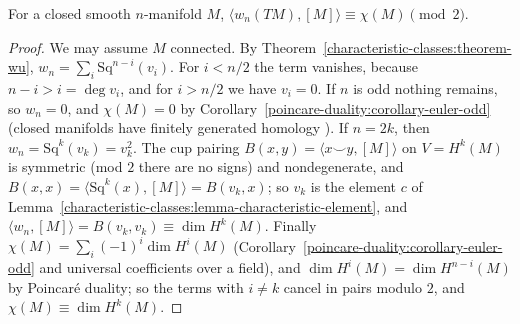 \begin{corollary}\label{characteristic-classes:corollary-top-stiefel-whitney}
For a closed smooth $n$-manifold $M$, $\langle w_n(TM), [M]\rangle \equiv \chi(M) \pmod 2$.
\end{corollary}

\begin{proof}
We may assume $M$ connected. By Theorem~\ref{characteristic-classes:theorem-wu}, $w_n = \sum_i\mathrm{Sq}^{n-i}(v_i)$. For $i < n/2$ the term vanishes,
because $n - i > i = \deg v_i$, and for $i > n/2$ we have $v_i = 0$. If $n$ is odd nothing remains, so $w_n = 0$, and $\chi(M) = 0$ by
Corollary~\ref{poincare-duality:corollary-euler-odd} (closed manifolds have finitely generated homology \cite[Appendix]{hatcher-at}). If $n = 2k$, then
$w_n = \mathrm{Sq}^k(v_k) = v_k^2$. The cup pairing $B(x, y) = \langle x \smile y, [M]\rangle$ on $V = H^k(M)$ is symmetric (mod $2$ there are no signs) and
nondegenerate, and $B(x, x) = \langle\mathrm{Sq}^k(x), [M]\rangle = B(v_k, x)$; so $v_k$ is the element $c$ of
Lemma~\ref{characteristic-classes:lemma-characteristic-element}, and $\langle w_n, [M]\rangle = B(v_k, v_k) \equiv \dim H^k(M)$. Finally
$\chi(M) = \sum_i(-1)^i\dim H^i(M)$ (Corollary~\ref{poincare-duality:corollary-euler-odd} and universal coefficients over a field), and
$\dim H^i(M) = \dim H^{n-i}(M)$ by Poincar\'e duality; so the terms with $i \neq k$ cancel in pairs modulo $2$, and $\chi(M) \equiv \dim H^k(M)$.
\end{proof}

